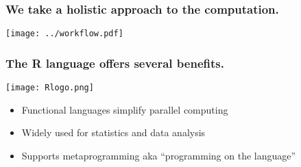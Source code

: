 \documentclass{beamer}
\begin{document}
\begin{frame}

    \frametitle{We take a holistic approach to the computation.}


\centerline{\texttt{[image: ../workflow.pdf]}}


\end{frame}
\begin{frame}

    \frametitle{The R language offers several benefits.}

\centerline{\texttt{[image: Rlogo.png]}}

    \begin{itemize}
        \item Functional languages simplify parallel computing
        \item Widely used for statistics and data analysis
        \item Supports metaprogramming aka ``programming on the
            language''
    \end{itemize}

\end{frame}
\end{document}
